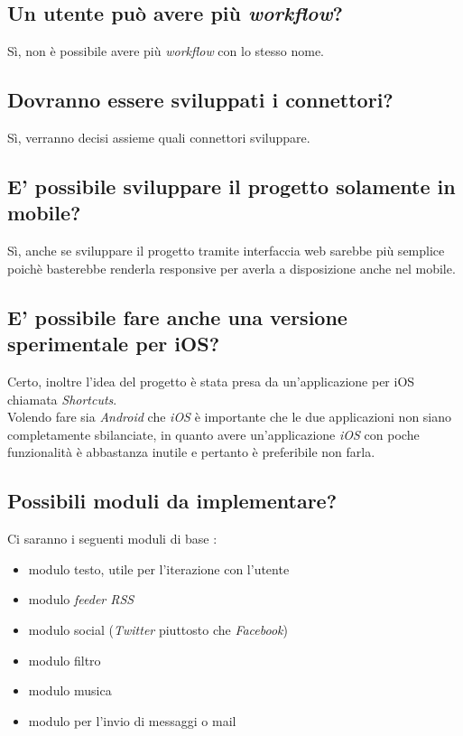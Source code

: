 \documentclass[a4paper,12pt]{article}
\begin{document}
	\subsection{Un utente può avere più \textit{workflow}?}
	Sì, non è possibile avere più \textit{workflow} con lo stesso nome.
	
	\subsection{Dovranno essere sviluppati i connettori?}
	Sì, verranno decisi assieme quali connettori sviluppare.
	
	\subsection{E' possibile sviluppare il progetto solamente in mobile?}
	Sì, anche se sviluppare il progetto  tramite interfaccia web sarebbe  più semplice poichè basterebbe renderla responsive per averla a disposizione anche nel mobile.
	
	\subsection{E' possibile fare anche una versione sperimentale per iOS?}
	Certo, inoltre l'idea del progetto è stata presa da un'applicazione per iOS chiamata \textit{Shortcuts}. \\
	Volendo fare sia \textit{Android} che \textit{iOS} è importante che le due applicazioni non siano completamente sbilanciate, in quanto avere un'applicazione \textit{iOS} con poche funzionalità è abbastanza inutile e pertanto è preferibile non farla.
	
	\subsection{Possibili moduli da implementare?}
	Ci saranno i seguenti moduli di base :
	\begin{itemize}
		\item modulo testo, utile per l'iterazione con l'utente 
		\item modulo \textit{feeder RSS} 
		\item modulo social (\textit{Twitter} piuttosto che \textit{Facebook})
		\item modulo filtro
		\item modulo musica
		\item modulo per l'invio di messaggi o mail
	\end{itemize}
\end{document}
